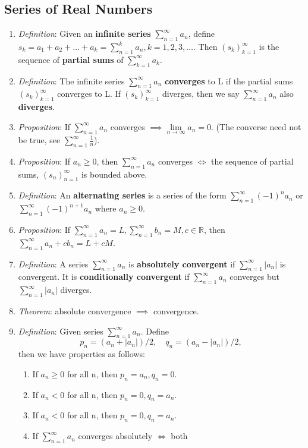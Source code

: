 \documentclass[10pt]{article}
\newcommand{\seqn}[1]{(#1)^\infty_{n=1}}
\newcommand{\seqk}[1]{(#1)^\infty_{k=1}}
\newcommand{\infsrsn}[1]{\sum\limits^\infty_{n=1}#1}
\newcommand{\infsrsk}[1]{\sum\limits^\infty_{k=1}#1}
\newcommand{\real}{\mathbb{R}}
\newcommand{\ntoinf}{\limits_{n\to\infty}}
\newcommand{\limn}[1]{\lim\ntoinf #1}
\begin{document}
\begin{multicols*}{3}
	\section{Series of Real Numbers}
	\begin{enumerate}
		\item \emph{Definition}: Given an \textbf{infinite series} $\infsrsn{a_n}$,
		      define $s_k=a_1+a_2+\dots+a_k=\sum_{n=1}^k a_n, k=1,2,3,\dots$.
		      Then $\seqk{s_k}$ is the sequence of \textbf{partial sums} of
		      $\infsrsk{a_k}$.
		\item \emph{Definition}: The infinite series $\infsrsn{a_n}$
		      \textbf{converges} to L if the partial sums $\seqk{s_k}$ converges to
		      L. If $\seqk{s_k}$ diverges, then we say $\infsrsn{a_n}$ also
		      \textbf{diverges}.
		\item \emph{Proposition}: If $\infsrsn{a_n}$ converges
		      $\implies\limn{a_n}=0$. (The converse need not be true, see
		      $\infsrsn{\frac{1}{n}}$).
		\item \emph{Proposition}: If $a_n\geq0$, then $\infsrsn{a_n}$ converges
		      $\iff$ the sequence of partial sums, $\seqn{s_n}$ is bounded above.
		\item \emph{Definition}: An \textbf{alternating series}  is a series of the
		      form $\infsrsn{(-1)^na_n}$ or $\infsrsn{(-1)^{n+1}a_n}$ where $a_n\geq0$.
		\item \emph{Proposition}: If $\infsrsn{a_n}=L, \infsrsn{b_n}=M,
			      c\in\real$, then $\infsrsn{a_n+cb_n}=L+cM$.
		\item \emph{Definition}: A series $\infsrsn{a_n}$ is \textbf{absolutely
			      convergent} if $\infsrsn{|a_n|}$ is convergent. It is
		      \textbf{conditionally convergent} if $\infsrsn{a_n}$ converges but
		      $\infsrsn{|a_n|}$ diverges.
		\item \emph{Theorem}: absolute convergence $\implies$ convergence.
		\item \emph{Definition}: Given series $\infsrsn{a_n}$. Define
		      \[p_n=(a_n+|a_n|)/2,\quad q_n=(a_n-|a_n|)/2,\] then we have properties
		      as follows:
		      \begin{enumerate}
			      \item If $a_n\geq 0$ for all n, then $p_n=a_n,q_n=0$.
			      \item If $a_n<0$ for all n, then $p_n=0,q_n=a_n$.
			      \item If $a_n<0$ for all n, then $p_n=0,q_n=a_n$.
			      \item If $\infsrsn{a_n}$ converges absolutely $\iff$ both

\end{enumerate}
\end{enumerate}
\end{multicols*}
\end{document}
